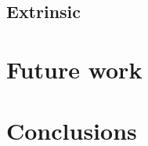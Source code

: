\documentclass[11pt]{article}
\begin{document}


\subsection{Extrinsic}

\section{Future work}


\section{Conclusions}


%



\end{document}
